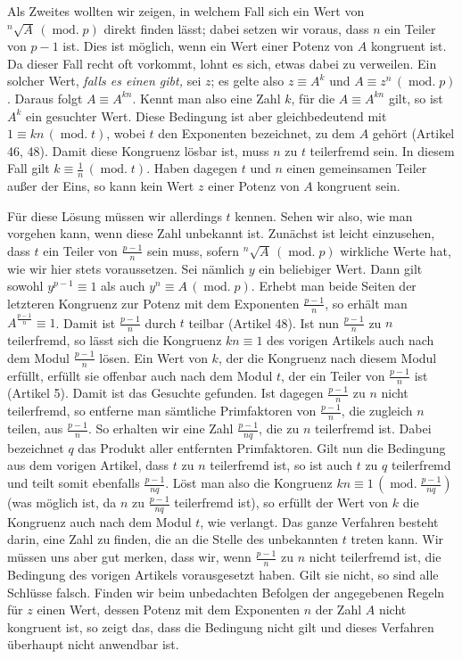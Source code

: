 Als Zweites wollten wir zeigen, in welchem Fall sich ein Wert von ${}^{n}\!\surd {A}\,(\operatorname{mod.}p)$ direkt finden lässt; dabei setzen wir voraus, dass $n$ ein Teiler von $p-1$ ist. Dies ist möglich, wenn ein Wert einer Potenz von $A$ kongruent ist. Da dieser Fall recht oft vorkommt, lohnt es sich, etwas dabei zu verweilen. Ein solcher Wert, \emph{falls es einen gibt,} sei $z$; es gelte also $z\equiv A^k$ und $A\equiv z^n\,(\operatorname{mod.}p)$. Daraus folgt $A\equiv A^{kn}$. Kennt man also eine Zahl $k$, für die $A\equiv A^{kn}$ gilt, so ist $A^k$ ein gesuchter Wert. Diese Bedingung ist aber gleichbedeutend mit $1\equiv kn\,(\operatorname{mod.}t)$, wobei $t$ den Exponenten bezeichnet, zu dem $A$ gehört (Artikel 46, 48). Damit diese Kongruenz lösbar ist, muss $n$ zu $t$ teilerfremd sein. In diesem Fall gilt $k\equiv\frac{1}{n}\,(\operatorname{mod.}t)$. Haben dagegen $t$ und $n$ einen gemeinsamen Teiler außer der Eins, so kann kein Wert $z$ einer Potenz von $A$ kongruent sein.

Für diese Lösung müssen wir allerdings $t$ kennen. Sehen wir also, wie man vorgehen kann, wenn diese Zahl unbekannt ist. Zunächst ist leicht einzusehen, dass $t$ ein Teiler von $\frac{p-1}{n}$ sein muss, sofern ${}^{n}\!\surd {A}\,(\operatorname{mod.}p)$ wirkliche Werte hat, wie wir hier stets voraussetzen. Sei nämlich $y$ ein beliebiger Wert. Dann gilt sowohl $y^{p-1}\equiv1$ als auch $y^n\equiv A\,(\operatorname{mod.}p)$. Erhebt man beide Seiten der letzteren Kongruenz zur Potenz mit dem Exponenten $\frac{p-1}{n}$, so erhält man $A^{\frac{p-1}{n}}\equiv1$. Damit ist $\frac{p-1}{n}$ durch $t$ teilbar (Artikel 48). Ist nun $\frac{p-1}{n}$ zu $n$ teilerfremd, so lässt sich die Kongruenz $kn\equiv1$ des vorigen Artikels auch nach dem Modul $\frac{p-1}{n}$ lösen. Ein Wert von $k$, der die Kongruenz nach diesem Modul erfüllt, erfüllt sie offenbar auch nach dem Modul $t$, der ein Teiler von $\frac{p-1}{n}$ ist (Artikel 5). Damit ist das Gesuchte gefunden. Ist dagegen $\frac{p-1}{n}$ zu $n$ nicht teilerfremd, so entferne man sämtliche Primfaktoren von $\frac{p-1}{n}$, die zugleich $n$ teilen, aus $\frac{p-1}{n}$. So erhalten wir eine Zahl $\frac{p-1}{nq}$, die zu $n$ teilerfremd ist. Dabei bezeichnet $q$ das Produkt aller entfernten Primfaktoren. Gilt nun die Bedingung aus dem vorigen Artikel, dass $t$ zu $n$ teilerfremd ist, so ist auch $t$ zu $q$ teilerfremd und teilt somit ebenfalls $\frac{p-1}{nq}$. Löst man also die Kongruenz $kn\equiv1\,(\operatorname{mod.}\frac{p-1}{nq})$ (was möglich ist, da $n$ zu $\frac{p-1}{nq}$ teilerfremd ist), so erfüllt der Wert von $k$ die Kongruenz auch nach dem Modul
$t$, wie verlangt. Das ganze Verfahren besteht darin, eine Zahl zu finden, die an die Stelle des unbekannten $t$ treten kann. Wir müssen uns aber gut merken, dass wir, wenn $\frac{p-1}{n}$ zu $n$ nicht teilerfremd ist, die Bedingung des vorigen Artikels vorausgesetzt haben. Gilt sie nicht, so sind alle Schlüsse falsch. Finden wir beim unbedachten Befolgen der angegebenen Regeln für $z$ einen Wert, dessen Potenz mit dem Exponenten $n$ der Zahl $A$ nicht kongruent ist, so zeigt das, dass die Bedingung nicht gilt und dieses Verfahren überhaupt nicht anwendbar ist.

